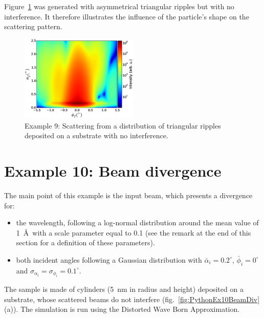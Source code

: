 Figure~\ref{fig:PythonEx9TriRipplenointerf} was generated with asymmetrical triangular ripples but with no interference. It therefore illustrates the influence of the particle's shape on the scattering pattern.

\begin{figure}[H]
\begin{center}
\includegraphics[width=0.5\textwidth]{Figures/py-ex/figure_ex009TriRippleNoInterf.eps}
\end{center}
\caption{Example 9: Scattering from a distribution of triangular ripples deposited on a substrate with no interference.}
\label{fig:PythonEx9TriRipplenointerf}
\end{figure}

\newpage
\section{Example 10: Beam divergence}
The main point of this example is the input beam, which presents a divergence for:
\begin{itemize}
\item the wavelength, following a log-normal distribution around the mean value of 1~\AA\ with a scale parameter equal to 0.1 (see the remark at the end of this section for a definition of these parameters).
\item  both incident angles following a Gaussian distribution with 
$\bar \alpha_i=0.2^{\circ}$, $\bar\phi_i=0^{\circ}$ and $\sigma_{\alpha_i}=\sigma_{\phi_i}=0.1^{\circ}$.
\end{itemize}
The sample is made of cylinders (5~nm in radius and height) deposited on a substrate, whose scattered beams do not interfere (fig.~\ref{fig:PythonEx10BeamDiv}(a)). The simulation is run using the Distorted Wave Born Approximation.

